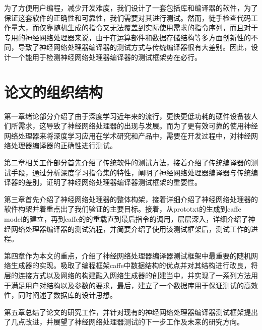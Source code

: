 为了方便用户编程，减少开发难度，我们设计了一套包括库和编译器的软件，为了保证这套软件的正确性和可靠性，我们需要对其进行测试。然而，徒手检查代码工作量大，而仅靠随机生成的指令又无法覆盖到实际使用需求的指令序列，而且对于专用的神经网络处理器来说，由于在运算部件和数据存储结构等多方面创新性的不同，导致了神经网络处理器编译器的测试方式与传统编译器很有大差别。因此，设计一个能用于检测神经网络处理器编译器的测试框架势在必行。

\section{论文的组织结构}
第一章绪论部分介绍了由于深度学习近年来的流行，更快更低功耗的硬件设备被人们所需求，这导致了神经网络处理器的出现与发展。而为了更有效可靠的使用神经网络处理器来将深度学习应用在学术研究和产品中，需要在开发过程中，对神经网络处理器编译器的正确性进行测试。

第二章相关工作部分首先介绍了传统软件的测试方法，接着介绍了传统编译器的测试手段，通过分析深度学习指令集的特性，阐明了神经网络处理器编译器与传统编译器的差别，证明了神经网络处理器编译器测试框架的重要性。

第三章首先介绍了神经网络处理器的整体构架，接着详细介绍了神经网络处理器的软件构架并着重点出了我们验证的主要目标。接着，从prototxt的生成到caffe\underline{ }model的建立，再到caffe的的重载直到最后指令的调用，层层深入，详细介绍了神经网络处理器编译器的测试流程，并简要介绍了使用该测试框架后，测试工作的进程。

第四章作为本文的重点，介绍了神经网络处理器编译器测试框架中最重要的随机网络生成器的实现。吸取了编程框架caffe中数据结构的优点并对其结构进行改良，将层的连接方式以及网络的构建融入网络生成器的创建当中，并实现了一系列方法用于满足用户对结构以及参数的要求，最后，建立了一个数据库用于保证测试的高效性，同时阐述了数据库的设计思想。

第五章总结了论文的研究工作，并针对现有的神经网络处理器编译器测试框架提出了几点改进，并展望了神经网络处理器测试的下一步工作及未来的研究方向。

